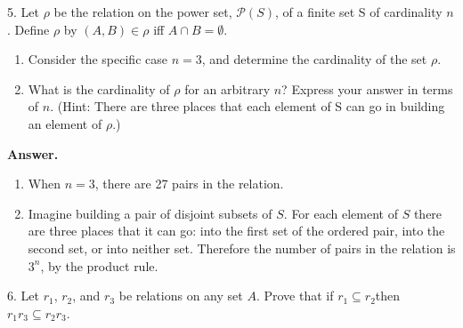 \documentclass[10pt,]{book}
\theoremstyle{plain}
\theoremstyle{definition}
\theoremstyle{definition}
\theoremstyle{definition}
\theoremstyle{definition}
\begin{document}
\begin{exercisegroup}
\item[5.]\hypertarget{exercise-5}{} Let \(\rho\) be the relation on the power set, \(\mathcal{P}(S )\), of a finite set S of cardinality \(n\). Define \(\rho\) by \((A,B)
\in \rho\) iff \(A\cap  B = \emptyset\).%
\par
\leavevmode%
\begin{enumerate}[label=\alph*]
\item\hypertarget{li-17}{} Consider the specific case \(n = 3\), and determine the cardinality of the set \(\rho\).%
\item\hypertarget{li-18}{} What is the cardinality of \(\rho\) for an arbitrary \(n\)? Express your answer in terms of \(n\). (Hint: There are three places that each element of S can go in building an element of \(\rho\).)%
\end{enumerate}
%
\par\smallskip
\par\smallskip
\noindent\textbf{Answer.}\hypertarget{answer-3}{}\quad
\leavevmode%
\begin{enumerate}[label=\alph*]
\item\hypertarget{li-19}{} When \(n=3\), there are 27 pairs in the relation.%
\item\hypertarget{li-20}{} Imagine building a pair of disjoint subsets of \(S\). For each element of \(S\) there are three places that it can go: into the first set of the ordered pair, into the second set, or into neither set. Therefore the number of pairs in the relation is \(3^n\), by the product rule.%
\end{enumerate}
%
\item[6.]\hypertarget{exercise-6}{} Let \(r_1\), \(r_2\), and \(r_3\) be relations on any set \(A\). Prove that if \(r_1\subseteq r_2\)then \(r_1r_3\subseteq r_2r_3\).%
\par\smallskip
\end{exercisegroup}
\par\smallskip\noindent
\typeout{************************************************}
\typeout{************************************************}
\end{document}
